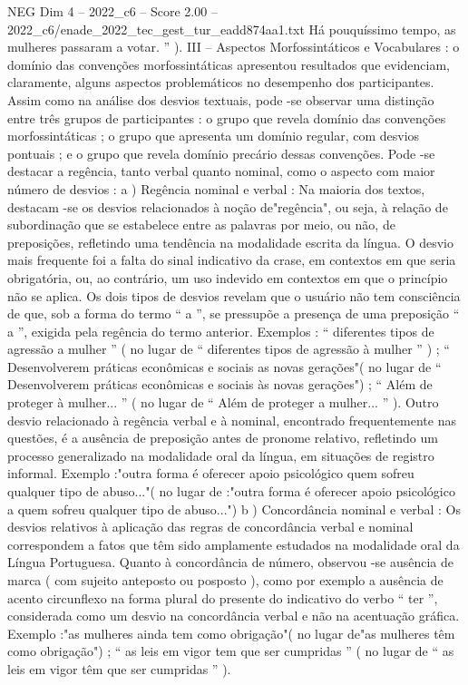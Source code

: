 \begin{textsample}{NEG Dim 4 – 2022\_c6 – Score 2.00 – 2022\_c6/enade\_2022\_tec\_gest\_tur\_eadd874aa1.txt}
Há pouquíssimo tempo, as mulheres passaram a votar. ” ).
III – Aspectos Morfossintáticos e Vocabulares : o domínio das convenções morfossintáticas apresentou resultados que evidenciam, claramente, alguns aspectos problemáticos no desempenho dos participantes.
Assim como na análise dos desvios textuais, pode -se observar uma distinção entre três grupos de participantes : o grupo que revela domínio das convenções morfossintáticas ; o grupo que apresenta um domínio regular, com desvios pontuais ; e o grupo que revela domínio precário dessas convenções.
Pode -se destacar a regência, tanto verbal quanto nominal, como o aspecto com maior número de desvios : a ) Regência nominal e verbal : Na maioria dos textos, destacam -se os desvios relacionados à noção de"regência", ou seja, à relação de subordinação que se estabelece entre as palavras por meio, ou não, de preposições, refletindo uma tendência na modalidade escrita da língua.
O desvio mais frequente foi a falta do sinal indicativo da crase, em contextos em que seria obrigatória, ou, ao contrário, um uso indevido em contextos em que o princípio não se aplica.
Os dois tipos de desvios revelam que o usuário não tem consciência de que, sob a forma do termo “ a ”, se pressupõe a presença de uma preposição “ a ”, exigida pela regência do termo anterior.
Exemplos : “ diferentes tipos de agressão a mulher ” ( no lugar de “ diferentes tipos de agressão à mulher ” ) ; “ Desenvolverem práticas econômicas e sociais as novas gerações"( no lugar de “ Desenvolverem práticas econômicas e sociais às novas gerações") ; “ Além de proteger à mulher... ” ( no lugar de “ Além de proteger a mulher... ” ).
Outro desvio relacionado à regência verbal e à nominal, encontrado frequentemente nas questões, é a ausência de preposição antes de pronome relativo, refletindo um processo generalizado na modalidade oral da língua, em situações de registro informal.
Exemplo :"outra forma é oferecer apoio psicológico quem sofreu qualquer tipo de abuso..."( no lugar de :"outra forma é oferecer apoio psicológico a quem sofreu qualquer tipo de abuso...") b ) Concordância nominal e verbal : Os desvios relativos à aplicação das regras de concordância verbal e nominal correspondem a fatos que têm sido amplamente estudados na modalidade oral da Língua Portuguesa.
Quanto à concordância de número, observou -se ausência de marca ( com sujeito anteposto ou posposto ), como por exemplo a ausência de acento circunflexo na forma plural do presente do indicativo do verbo “ ter ”, considerada como um desvio na concordância verbal e não na acentuação gráfica.
Exemplo :"as mulheres ainda tem como obrigação"( no lugar de"as mulheres têm como obrigação") ; “ as leis em vigor tem que ser cumpridas ” ( no lugar de “ as leis em vigor têm que ser cumpridas ” ).

\end{textsample}
